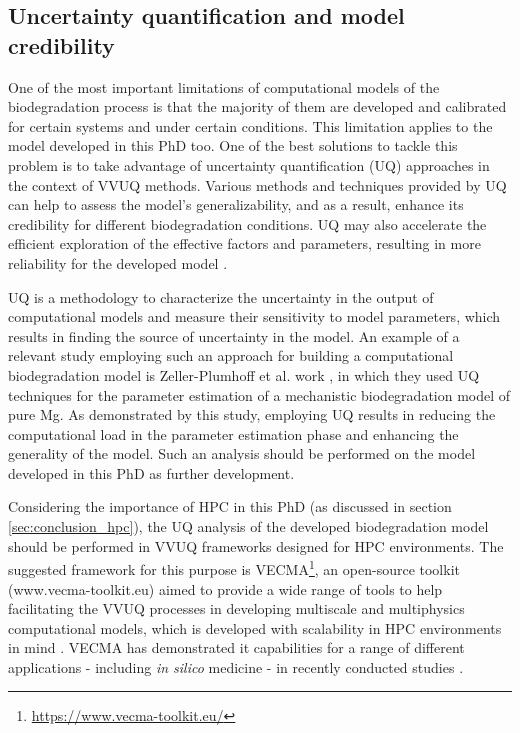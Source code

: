 \subsection{Uncertainty quantification and model credibility } \label{sec:conclusion_vvuq}

One of the most important limitations of computational models of the biodegradation process is that the majority of them are developed and calibrated for certain systems and under certain conditions. This limitation applies to the model developed in this PhD too. One of the best solutions to tackle this problem is to take advantage of uncertainty quantification (\gls{UQ}) approaches in the context of \gls{VVUQ} methods. Various methods and techniques provided by \gls{UQ} can help to assess the model's generalizability, and as a result, enhance its credibility for different biodegradation conditions. \gls{UQ} may also accelerate the efficient exploration of the effective factors and parameters, resulting in more reliability for the developed model \cite{Albaraghtheh2022}.

\gls{UQ} is a methodology to characterize the uncertainty in the output of computational models and measure their sensitivity to model parameters, which results in finding the source of uncertainty in the model. An example of a relevant study employing such an approach for building a computational biodegradation model is Zeller-Plumhoff et al. work \cite{Zeller-Plumhoff2022}, in which they used \gls{UQ} techniques for the parameter estimation of a mechanistic biodegradation model of pure Mg. As demonstrated by this study, employing \gls{UQ} results in reducing the computational load in the parameter estimation phase and enhancing the generality of the model. Such an analysis should be performed on the model developed in this PhD as further development.

Considering the importance of \gls{HPC} in this PhD (as discussed in section \ref{sec:conclusion_hpc}), the \gls{UQ} analysis of the developed biodegradation model should be performed in \gls{VVUQ} frameworks designed for \gls{HPC} environments. The suggested framework for this purpose is VECMA\footnote{\url{https://www.vecma-toolkit.eu/}}, an open-source toolkit (www.vecma-toolkit.eu) aimed to provide a wide range of tools to help facilitating the \gls{VVUQ} processes in developing multiscale and multiphysics computational models, which is developed with scalability in \gls{HPC} environments in mind \cite{Groen2021}. VECMA has demonstrated it capabilities for a range of different applications - including \textit{in silico} medicine - in recently conducted studies \cite{Suleimenova2021,Suter2021,Vassaux2021,Coveney2021}.


